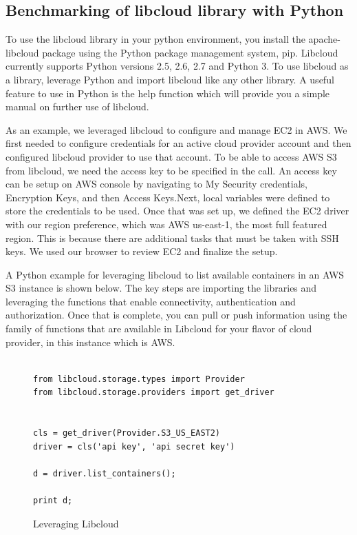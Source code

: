 \subsection{Benchmarking of libcloud library with Python}

To use the libcloud library in your python environment, you install the
apache-libcloud package using the Python package management system, pip.
Libcloud currently supports Python versions 2.5, 2.6, 2.7 and Python 3. To use
libcloud as a library, leverage Python and import libcloud like any other
library. A useful feature to use in Python is the help function which will
provide you a simple manual on further use of libcloud.

As an example, we leveraged libcloud to configure and manage EC2 in AWS. We
first needed to configure credentials for an active cloud provider account and
then configured libcloud provider to use that account. To be able to access AWS
S3 from libcloud, we need the access key to be specified in the call. An access
key can be setup on AWS console by navigating to My Security credentials,
Encryption Keys, and then Access Keys.Next, local variables were defined to
store the credentials to be used. Once that was set up, we defined the EC2 
driver with our region preference, which was AWS us-east-1, the most full
featured region. This is because there are additional tasks that must be taken
with SSH keys. We used our browser to review EC2 and finalize the setup.

A Python example for leveraging libcloud to list available containers in an AWS
S3 instance is shown below. The key steps are importing the libraries and
leveraging the functions that enable connectivity, authentication and
authorization. Once that is complete, you can pull or push information using the
family of functions that are available in Libcloud for your flavor of cloud
provider, in this instance which is AWS.


\begin{figure}[htb]

\begin{verbatim}

from libcloud.storage.types import Provider
from libcloud.storage.providers import get_driver


cls = get_driver(Provider.S3_US_EAST2)
driver = cls('api key', 'api secret key')

d = driver.list_containers();

print d;

\end{verbatim}

\caption{Leveraging Libcloud
~\cite{hid-sp18-518-LibCloud}}\label{c:libcloud-example}

\end{figure}

